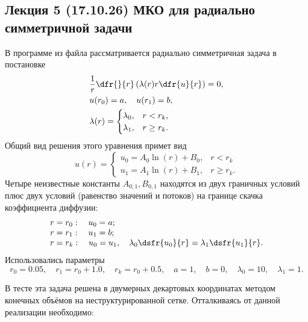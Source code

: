 \subsection{Лекция 5 (17.10.26) МКО для радиально симметричной задачи}
В программе из файла  рассматривается радиально симметричная задача в постановке
\begin{align*}
&\frac1r\dfr{}{r}\left(\lambda(r) r\dfr{u}{r}\right) = 0, \\
&u(r_0) = a, \quad u(r_1) = b,\\
&\lambda(r) = \begin{cases}
\lambda_0, & r < r_k,\\
\lambda_1, & r \geq r_k.\\
\end{cases}
\end{align*}
Общий вид решения этого уравнения примет вид
\begin{equation*}
u(r) = 
\begin{cases}
u_{0} = A_0 \ln(r) + B_0, & r < r_k\\
u_{1} = A_1 \ln(r) + B_1, & r \geq r_k.
\end{cases}
\end{equation*}
Четыре неизвестные константы $A_{0,1}, B_{0,1}$ находятся из двух граничных условий плюс двух условий
(равенство значений и потоков) на границе скачка коэффициента диффузии:
\begin{equation}
\label{eq:fvm_radial_partial_lambda_conditions}
\begin{array}{l}
r = r_0: \quad u_0 = a;\\
r = r_1: \quad u_1 = b;\\
r = r_k: \quad u_0 = u_1, \quad \lambda_0\dsfr{u_0}{r} = \lambda_1\dsfr{u_1}{r}.
\end{array}
\end{equation}
Использовались параметры
\begin{equation*}
r_0 = 0.05, \quad r_1 = r_0 + 1.0, \quad r_k = r_0 + 0.5, \quad a = 1, \quad b = 0, \quad \lambda_0 = 10, \quad \lambda_1 = 1.
\end{equation*}

В тесте 
эта задача решена в двумерных декартовых координатах методом конечных объёмов на неструктурированной сетке.
Отталкиваясь от данной реализации необходимо:

